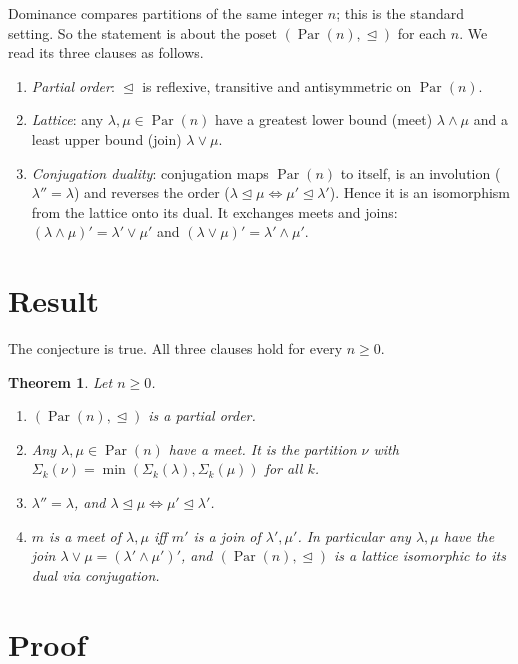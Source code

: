 \documentclass[11pt]{article}
\theoremstyle{plain}
\newtheorem{theorem}{Theorem}
\theoremstyle{definition}
\theoremstyle{remark}
\newcommand{\Par}{\operatorname{Par}}
\newcommand{\dom}{\trianglelefteq}
\begin{document}
Dominance compares partitions of the same integer $n$; this is the standard
setting. So the statement is about the poset $(\Par(n),\dom)$ for each $n$. We
read its three clauses as follows.
\begin{enumerate}
  \item \emph{Partial order}: $\dom$ is reflexive, transitive and
    antisymmetric on $\Par(n)$.
  \item \emph{Lattice}: any $\lambda,\mu\in\Par(n)$ have a greatest lower bound
    (meet) $\lambda\wedge\mu$ and a least upper bound (join) $\lambda\vee\mu$.
  \item \emph{Conjugation duality}: conjugation maps $\Par(n)$ to itself, is an
    involution ($\lambda''=\lambda$) and reverses the order
    ($\lambda\dom\mu\iff\mu'\dom\lambda'$). Hence it is an isomorphism from the
    lattice onto its dual. It exchanges meets and joins:
    $(\lambda\wedge\mu)'=\lambda'\vee\mu'$ and
    $(\lambda\vee\mu)'=\lambda'\wedge\mu'$.
\end{enumerate}

\section{Result}


The conjecture is true. All three clauses hold for every $n\ge0$.

\begin{theorem}\label{thm:main}
Let $n\ge0$.
\begin{enumerate}
  \item[(a)] $(\Par(n),\dom)$ is a partial order.
  \item[(b)] Any $\lambda,\mu\in\Par(n)$ have a meet. It is the partition $\nu$
    with $\Sigma_k(\nu)=\min(\Sigma_k(\lambda),\Sigma_k(\mu))$ for all $k$.
  \item[(c)] $\lambda''=\lambda$, and $\lambda\dom\mu\iff\mu'\dom\lambda'$.
  \item[(d)] $m$ is a meet of $\lambda,\mu$ iff $m'$ is a join of
    $\lambda',\mu'$. In particular any $\lambda,\mu$ have the join
    $\lambda\vee\mu=(\lambda'\wedge\mu')'$, and $(\Par(n),\dom)$ is a lattice
    isomorphic to its dual via conjugation.
\end{enumerate}
\end{theorem}

\section{Proof}
\end{document}
